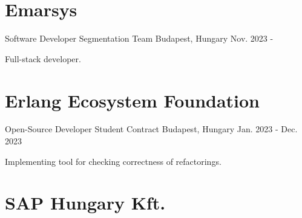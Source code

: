 
\section*{Emarsys}

\begin{cventries}

  \cventry
    {Software Developer} %
    {Segmentation Team}
    {Budapest, Hungary} %
    {Nov. 2023 - } %
    {
      \begin{cvitems} %
        \item {Full-stack developer.}
      \end{cvitems}
    }


\end{cventries}

\section*{Erlang Ecosystem Foundation}

\begin{cventries}

  \cventry
    {Open-Source Developer} %
    {Student Contract}
    {Budapest, Hungary} %
    {Jan. 2023 - Dec. 2023} %
    {
      \begin{cvitems} %
        \item {Implementing tool for checking correctness of refactorings.}
      \end{cvitems}
    }

\end{cventries}

\section*{SAP Hungary Kft.}


